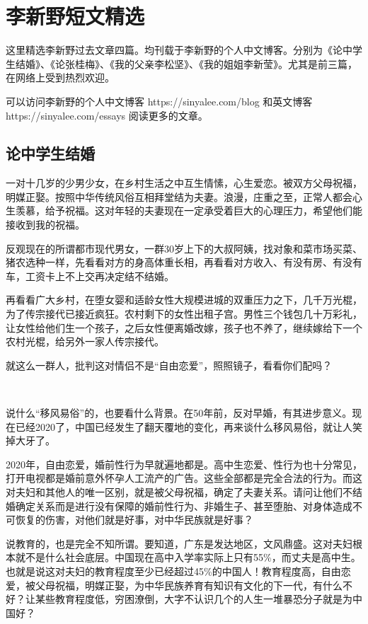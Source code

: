 \chapter{李新野短文精选}

这里精选李新野过去文章四篇。均刊载于李新野的个人中文博客。分别为《论中学生结婚》、《论张桂梅》、《我的父亲李松坚》、《我的姐姐李新莹》。尤其是前三篇，在网络上受到热烈欢迎。

可以访问李新野的个人中文博客 https://sinyalee.com/blog 和英文博客 https://sinyalee.com/essays 阅读更多的文章。

\newpage

\section{论中学生结婚}

一对十几岁的少男少女，在乡村生活之中互生情愫，心生爱恋。被双方父母祝福，明媒正娶。按照中华传统风俗互相拜堂结为夫妻。浪漫，庄重之至，正常人都会心生羡慕，给予祝福。这对年轻的夫妻现在一定承受着巨大的心理压力，希望他们能接收到我的祝福。

反观现在的所谓都市现代男女，一群30岁上下的大叔阿姨，找对象和菜市场买菜、猪农选种一样，先看看对方的身高体重长相，再看看对方收入、有没有房、有没有车，工资卡上不上交再决定结不结婚。

再看看广大乡村，在堕女婴和适龄女性大规模进城的双重压力之下，几千万光棍，为了传宗接代已接近疯狂。农村剩下的女性出租子宫。男性三个钱包几十万彩礼，让女性给他们生一个孩子，之后女性便离婚改嫁，孩子也不养了，继续嫁给下一个农村光棍，给另外一家人传宗接代。

就这么一群人，批判这对情侣不是``自由恋爱''，照照镜子，看看你们配吗？

\ 

说什么``移风易俗''的，也要看什么背景。在50年前，反对早婚，有其进步意义。现在已经2020了，中国已经发生了翻天覆地的变化，再来谈什么移风易俗，就让人笑掉大牙了。

2020年，自由恋爱，婚前性行为早就遍地都是。高中生恋爱、性行为也十分常见，打开电视都是婚前意外怀孕人工流产的广告。这些全部都是完全合法的行为。而这对夫妇和其他人的唯一区别，就是被父母祝福，确定了夫妻关系。请问让他们不结婚确定关系而是进行没有保障的婚前性行为、非婚生子、甚至堕胎、对身体造成不可恢复的伤害，对他们就是好事，对中华民族就是好事？

说教育的，也是完全不知所谓。要知道，广东是发达地区，文风鼎盛。这对夫妇根本就不是什么社会底层。中国现在高中入学率实际上只有55\%，而丈夫是高中生。也就是说这对夫妇的教育程度至少已经超过45\%的中国人！教育程度高，自由恋爱，被父母祝福，明媒正娶，为中华民族养育有知识有文化的下一代，有什么不好？让某些教育程度低，穷困潦倒，大字不认识几个的人生一堆暴恐分子就是为中国好？

